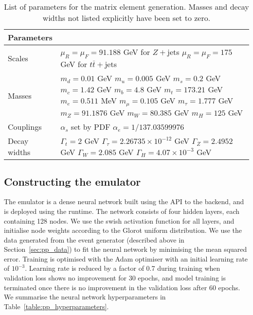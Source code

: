 \documentclass[main.tex]{subfiles}
\begin{document}
\begin{table}[t]
    \centering
    \begin{tabular}{ll}
        \toprule
        Parameters & \\
        \midrule
        Scales & \makecell[l]{$\mu_{R} = \mu_{F} = 91.188$ GeV for $Z+$jets \\ $\mu_{R} = \mu_{F} = 175$ GeV for $t\bar{t}+$jets} \\
        \midrule
        Masses & \makecell[l]{$m_{d} = 0.01$ GeV \\ $m_{u} = 0.005$ GeV \\ $m_{s} = 0.2$ GeV \\ $m_{c} = 1.42$ GeV \\ $m_{b} = 4.8$ GeV \\ $m_{t} = 173.21$ GeV \\ $m_{e} = 0.511$ MeV \\ $m_{\mu} = 0.105$ GeV \\ $m_{\tau} = 1.777$ GeV \\ $m_{Z} = 91.1876$ GeV \\ $m_{W} = 80.385$ GeV \\ $m_{H} = 125$ GeV} \\
        \midrule
        Couplings & \makecell[l]{$\alpha_{s}$ set by PDF \\ $\alpha_{e} = 1/137.03599976$} \\
        \midrule
        Decay widths & \makecell[l]{$\Gamma_{t} = 2$ GeV \\ $\Gamma_{\tau} = 2.26735 \times 10^{-12}$ GeV \\ $\Gamma_{Z} = 2.4952$ GeV \\ $\Gamma_{W} = 2.085$ GeV \\ $\Gamma_{H} = 4.07 \times 10^{-3}$ GeV} \\
        \bottomrule
        \end{tabular}
    \caption{List of parameters for the matrix element generation. Masses and decay widths not listed explicitly have been set to zero.}
    \label{table:fame3_params}
\end{table}

\subsection{Constructing the emulator}\label{sec:pp_emulator}
The emulator is a dense neural network built using the {\Keras} API
to the {\TensorFlow} backend, and is deployed using the {\ONNX} runtime.
The network consists of four hidden
layers, each containing 128 nodes. We use the swish activation function
for all layers, and initialise node weights according to the Glorot uniform
distribution. We use the data generated from the {\Sherpa} event
generator (described above in Section~\ref{sec:pp_data})
to fit the neural network by minimising the mean squared error.
Training is optimised with the Adam optimiser with an initial
learning rate of $10^{-3}$. Learning rate is reduced by a factor
of 0.7 during training when validation loss shows no improvement
for 30 epochs, and model training is terminated once there is no
improvement in the validation loss after 60 epochs. We summarise
the neural network hyperparameters in Table~\ref{table:pp_hyperparameters}.
\end{document}
